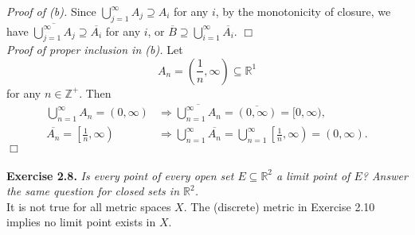 \documentclass{article}
\begin{document}
\emph{Proof of (b).}
Since $\bigcup^{\infty}_{j=1} A_j \supseteq A_i$ for any $i$,
by the monotonicity of closure, we have
$\overline{\bigcup^{\infty}_{j=1} A_j} \supseteq \overline{A_i}$ for any $i$,
or $\overline{B} \supseteq \bigcup^{\infty}_{i=1} \overline{A_i}$.
$\Box$\\

\emph{Proof of proper inclusion in (b).}
Let
$$A_{n} = \left( \frac{1}{n}, \infty \right) \subseteq \mathbb{R}^1$$
for any $n \in \mathbb{Z}^+$.
Then
\begin{align*}
\bigcup^{\infty}_{n=1} A_n = (0, \infty)
&\Longrightarrow
\overline{\bigcup^{\infty}_{n=1} A_n} = \overline{(0, \infty)} = [0, \infty), \\
\overline{A_n} = \left[ \frac{1}{n}, \infty \right)
&\Longrightarrow
\bigcup^{\infty}_{n=1} \overline{A_n}
= \bigcup^{\infty}_{n=1} \left[ \frac{1}{n}, \infty \right)
= (0, \infty).
\end{align*}
$\Box$ \\\\






\textbf{Exercise 2.8.}
\emph{Is every point of every open set $E \subseteq \mathbb{R}^2$ a limit point of $E$?
Answer the same question for closed sets in $\mathbb{R}^2$. } \\

It is not true for all metric spaces $X$.
The (discrete) metric in Exercise 2.10 implies no limit point exists in $X$. \\
\end{document}
